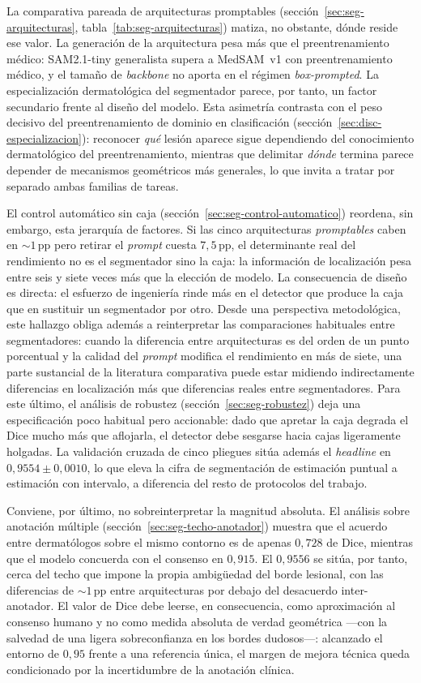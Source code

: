 La comparativa pareada de arquitecturas promptables
(sección~\ref{sec:seg-arquitecturas},
tabla~\ref{tab:seg-arquitecturas}) matiza, no obstante, dónde reside
ese valor. La generación de la arquitectura pesa más que el
preentrenamiento médico: SAM2.1-tiny generalista supera a MedSAM~v1
con preentrenamiento médico, y el tamaño de \emph{backbone} no
aporta en el régimen \emph{box-prompted}. La especialización
dermatológica del segmentador parece, por tanto, un factor secundario
frente al diseño del modelo. Esta asimetría contrasta con el peso
decisivo del preentrenamiento de dominio en clasificación
(sección~\ref{sec:disc-especializacion}): reconocer \emph{qué} lesión
aparece sigue dependiendo del conocimiento dermatológico del
preentrenamiento, mientras que delimitar \emph{dónde} termina parece
depender de mecanismos geométricos más generales, lo que invita a
tratar por separado ambas familias de tareas.

El control automático sin caja
(sección~\ref{sec:seg-control-automatico}) reordena, sin embargo,
esta jerarquía de factores. Si las cinco arquitecturas
\emph{promptables} caben en $\sim 1$\,pp pero retirar el \emph{prompt}
cuesta $7{,}5$\,pp, el determinante real del rendimiento no es el
segmentador sino la caja: la información de localización pesa entre
seis y siete veces más que la elección de modelo. La consecuencia de
diseño es directa: el esfuerzo de ingeniería rinde más en el detector
que produce la caja que en sustituir un segmentador por otro. Desde una
perspectiva metodológica, este hallazgo obliga
además a reinterpretar las comparaciones habituales entre segmentadores:
cuando la diferencia entre arquitecturas es del orden de un punto
porcentual y la calidad del \emph{prompt} modifica el rendimiento en más
de siete, una parte sustancial de la literatura comparativa puede estar
midiendo indirectamente diferencias en localización más que diferencias
reales entre segmentadores. Para este último, el análisis de robustez
(sección~\ref{sec:seg-robustez}) deja una especificación poco
habitual pero accionable: dado que apretar la caja degrada el Dice
mucho más que aflojarla, el detector debe sesgarse hacia cajas
ligeramente holgadas. La validación cruzada de cinco pliegues sitúa
además el \emph{headline} en $0{,}9554\pm 0{,}0010$, lo que eleva la
cifra de segmentación de estimación puntual a estimación con
intervalo, a diferencia del resto de protocolos del trabajo.

Conviene, por último, no sobreinterpretar la magnitud absoluta. El
análisis sobre anotación múltiple
(sección~\ref{sec:seg-techo-anotador}) muestra que el acuerdo entre
dermatólogos sobre el mismo contorno es de apenas $0{,}728$ de Dice,
mientras que el modelo concuerda con el consenso en $0{,}915$. El
$0{,}9556$ se sitúa, por tanto, cerca del techo que impone la propia
ambigüedad del borde lesional, con las diferencias de $\sim 1$\,pp entre
arquitecturas por debajo del desacuerdo inter-anotador. El valor de Dice
debe leerse, en consecuencia, como aproximación al consenso humano y no
como medida absoluta de verdad geométrica ---con la salvedad de una
ligera sobreconfianza en los bordes dudosos---: alcanzado el entorno de
$0{,}95$ frente a una referencia única, el margen de mejora técnica queda
condicionado por la incertidumbre de la anotación clínica.

